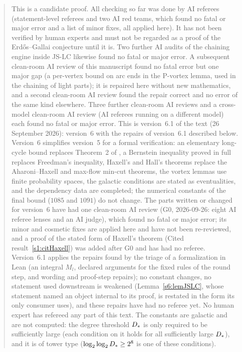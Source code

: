 \begin{abstract}
This is a candidate proof. All checking so far was done by AI referees
(statement-level referees and two AI red teams, which found no fatal or major
error and a list of minor fixes, all applied here). It has not been verified by
human experts and must not be regarded as a proof of the Erd\H{o}s--Gallai
conjecture until it is. Two further AI audits of the chaining engine inside
JS-LC likewise found no fatal or major error. A subsequent clean-room AI review
of this manuscript found no fatal error but one major gap (a per-vertex bound on
arc ends in the P-vortex lemma, used in the chaining of light parts); it is
repaired here without new mathematics, and a second clean-room AI review
found the repair correct and no error of the same kind elsewhere. Three further
clean-room AI reviews and a cross-model clean-room AI review (AI referees running
on a different model) each found no fatal or major error. This is
version~6.1 of the text (26 September 2026): version~6 with the repairs of
version~6.1 described below. Version~6 simplifies version~5 for a formal
verification: an elementary long-cycle bound replaces Theorem~2 of \cite{BM},
a Bernstein inequality proved in full replaces Freedman's inequality, Haxell's
and Hall's theorems replace the Aharoni--Haxell and max-flow min-cut theorems,
the vortex lemmas use finite probability spaces, the galactic conditions are
stated as eventualities, and the dependency data are completed; the numerical
constants of the final bound ($1085$ and $1091$) do not change. The parts written or changed for version~6 have had
one clean-room AI review (G0, 2026-09-26: eight AI referee lenses and an AI
judge), which found no fatal or major error; its minor and cosmetic fixes are
applied here and have not been re-reviewed, and a proof of the stated form of
Haxell's theorem (Cited result~\ref{s1:citHaxell}) was added after G0 and has had no
referee. Version~6.1 applies the repairs found by the triage of a formalization in
Lean (an integral $M_l$, declared arguments for the fixed rules of the round step,
and wording and proof-step repairs); no constant changes, no statement used
downstream is weakened (Lemma~\ref{s6:lemJSLC}, whose statement named an object
internal to its proof, is restated in the form its only consumer uses), and these
repairs have had no referee yet. No human expert has refereed any
part of this text. The constants are galactic and
are not computed: the degree threshold $\Dstar$ is only required to be sufficiently large (each
condition on it holds for all sufficiently large $\Dstar$), and it is of tower type
($\log_2\log_2\Dstar\ge2^8$ is one of these conditions).
\end{abstract}

